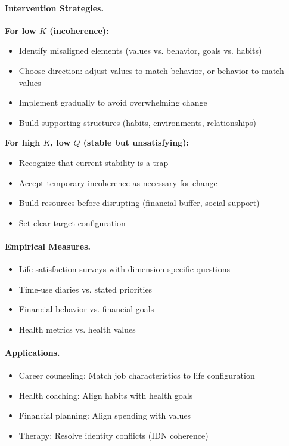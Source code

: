 \documentclass[12pt,a4paper]{article}
\begin{document}
\paragraph{Intervention Strategies.}
\textbf{For low $K$ (incoherence):}
\begin{itemize}
  \item Identify misaligned elements (values vs. behavior, goals vs. habits)
  \item Choose direction: adjust values to match behavior, or behavior to match values
  \item Implement gradually to avoid overwhelming change
  \item Build supporting structures (habits, environments, relationships)
\end{itemize}

\textbf{For high $K$, low $Q$ (stable but unsatisfying):}
\begin{itemize}
  \item Recognize that current stability is a trap
  \item Accept temporary incoherence as necessary for change
  \item Build resources before disrupting (financial buffer, social support)
  \item Set clear target configuration
\end{itemize}

\paragraph{Empirical Measures.}
\begin{itemize}
  \item Life satisfaction surveys with dimension-specific questions
  \item Time-use diaries vs. stated priorities
  \item Financial behavior vs. financial goals
  \item Health metrics vs. health values
\end{itemize}

\paragraph{Applications.}
\begin{itemize}
  \item Career counseling: Match job characteristics to life configuration
  \item Health coaching: Align habits with health goals
  \item Financial planning: Align spending with values
  \item Therapy: Resolve identity conflicts (IDN coherence)
\end{itemize}
\end{document}
